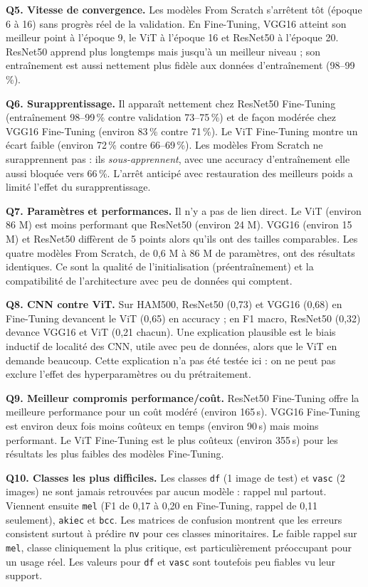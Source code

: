 \documentclass[12pt,a4paper]{article}
\begin{document}
\textbf{Q5. Vitesse de convergence.} Les modèles From Scratch s'arrêtent tôt (époque 6 à 16) sans progrès réel de la validation. En Fine-Tuning, VGG16 atteint son meilleur point à l'époque 9, le ViT à l'époque 16 et ResNet50 à l'époque 20. ResNet50 apprend plus longtemps mais jusqu'à un meilleur niveau ; son entraînement est aussi nettement plus fidèle aux données d'entraînement (98--99\,\%).

\textbf{Q6. Surapprentissage.} Il apparaît nettement chez ResNet50 Fine-Tuning (entraînement 98--99\,\% contre validation 73--75\,\%) et de façon modérée chez VGG16 Fine-Tuning (environ 83\,\% contre 71\,\%). Le ViT Fine-Tuning montre un écart faible (environ 72\,\% contre 66--69\,\%). Les modèles From Scratch ne surapprennent pas : ils \emph{sous-apprennent}, avec une accuracy d'entraînement elle aussi bloquée vers 66\,\%. L'arrêt anticipé avec restauration des meilleurs poids a limité l'effet du surapprentissage.

\textbf{Q7. Paramètres et performances.} Il n'y a pas de lien direct. Le ViT (environ 86 M) est moins performant que ResNet50 (environ 24 M). VGG16 (environ 15 M) et ResNet50 diffèrent de 5 points alors qu'ils ont des tailles comparables. Les quatre modèles From Scratch, de 0,6 M à 86 M de paramètres, ont des résultats identiques. Ce sont la qualité de l'initialisation (préentraînement) et la compatibilité de l'architecture avec peu de données qui comptent.

\textbf{Q8. CNN contre ViT.} Sur HAM500, ResNet50 (0,73) et VGG16 (0,68) en Fine-Tuning devancent le ViT (0,65) en accuracy ; en F1 macro, ResNet50 (0,32) devance VGG16 et ViT (0,21 chacun). Une explication plausible est le biais inductif de localité des CNN, utile avec peu de données, alors que le ViT en demande beaucoup. Cette explication n'a pas été testée ici : on ne peut pas exclure l'effet des hyperparamètres ou du prétraitement.

\textbf{Q9. Meilleur compromis performance/coût.} ResNet50 Fine-Tuning offre la meilleure performance pour un coût modéré (environ 165\,s). VGG16 Fine-Tuning est environ deux fois moins coûteux en temps (environ 90\,s) mais moins performant. Le ViT Fine-Tuning est le plus coûteux (environ 355\,s) pour les résultats les plus faibles des modèles Fine-Tuning.

\textbf{Q10. Classes les plus difficiles.} Les classes \texttt{df} (1 image de test) et \texttt{vasc} (2 images) ne sont jamais retrouvées par aucun modèle : rappel nul partout. Viennent ensuite \texttt{mel} (F1 de 0,17 à 0,20 en Fine-Tuning, rappel de 0,11 seulement), \texttt{akiec} et \texttt{bcc}. Les matrices de confusion montrent que les erreurs consistent surtout à prédire \texttt{nv} pour ces classes minoritaires. Le faible rappel sur \texttt{mel}, classe cliniquement la plus critique, est particulièrement préoccupant pour un usage réel. Les valeurs pour \texttt{df} et \texttt{vasc} sont toutefois peu fiables vu leur support.
\end{document}
